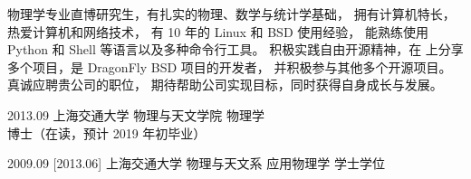 \documentclass[zh]{resume}
\begin{document}
\makeheader

{\onehalfspacing\hspace{1.8em}
物理学专业直博研究生，有扎实的物理、数学与统计学基础，
拥有计算机特长，热爱计算机和网络技术，
有 10 年的 Linux 和 BSD 使用经验，
能熟练使用 Python 和 Shell 等语言以及多种命令行工具。
积极实践自由开源精神，在 
上分享多个项目，是 DragonFly BSD 项目的开发者，
并积极参与其他多个开源项目。
真诚应聘贵公司的\textbf{\getposition}职位，
期待帮助公司实现目标，同时获得自身成长与发展。
\par}  %

\begin{competences}
\end{competences}

\begin{educations}
  \education%
    {2013.09}%
    {上海交通大学}%
    {物理与天文学院}%
    {物理学}%
    {博士（在读，预计 2019 年初毕业）}

  \separator{0.7em}
  \education%
    {2009.09}%
    [2013.06]%
    {上海交通大学}%
    {物理与天文系}%
    {应用物理学}%
    {学士学位}
\end{educations}
\end{document}
